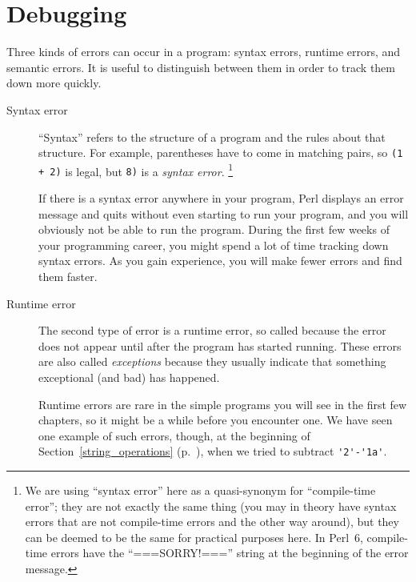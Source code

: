 \section{Debugging}

Three kinds of errors can occur in a program: syntax errors, runtime 
errors, and semantic errors.  It is useful
to distinguish between them in order to track them down more quickly.

\begin{description}

\item[Syntax error] ``Syntax'' refers to the structure of a program
  and the rules about that structure.  For example, parentheses have
  to come in matching pairs, so {\tt (1 + 2)} is legal, but 
{\tt 8)} is a \emph{syntax error}. \footnote{We are using 
``syntax error'' here as a quasi-synonym for ``compile-time error''; 
they are not exactly the same thing (you may in theory have 
syntax errors that are not compile-time errors and the other way 
around), but they can be deemed to be the same for 
practical purposes here. In Perl~6, compile-time errors 
have the ``===SORRY!==='' string at the beginning of 
the error message.}


If there is a syntax error
anywhere in your program, Perl displays an error message and quits 
without even starting to run your program, and you will 
obviously not be able to run the program.  During the first few
weeks of your programming career, you might spend a lot of
time tracking down syntax errors.  As you gain experience, you will
make fewer errors and find them faster.


\item[Runtime error] The second type of error is a runtime error, so
  called because the error does not appear until after the program has
  started running.  These errors are also called \emph{exceptions}
  because they usually indicate that something exceptional (and bad)
  has happened.   
    

Runtime errors are rare in the simple programs you will see in the
first few chapters, so it might be a while before you encounter one. 
We have seen one example of such errors, though, at the beginning 
of Section~\ref{string_operations} (p.~\pageref{string_operations}), 
when we tried to subtract \verb"'2'-'1a'". 



\end{description}
